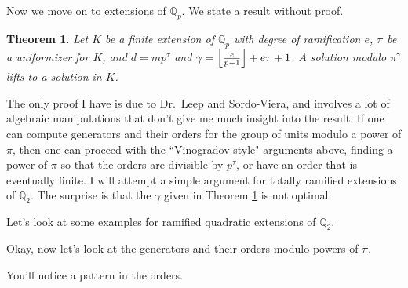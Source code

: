 \documentclass{article}
\newtheorem{theorem}{Theorem}
\DeclarePairedDelimiter\floor{\lfloor}{\rfloor}
\begin{document}
Now we move on to extensions of $\mathbb{Q}_p$.  We state a result without proof.

\begin{theorem}\label{leep}
Let $K$ be a finite extension of $\mathbb{Q}_p$ with degree of ramification $e$, $\pi$ be a uniformizer for $K$, and $d=m p^\tau$ and $\gamma = \floor*{\frac{e}{p-1}} + e\tau + 1$.  A solution modulo $\pi^\gamma$ lifts to a solution in $K$.
\end{theorem}

The only proof I have is due to Dr.\ Leep and Sordo-Viera, and involves a lot of algebraic manipulations that don't give me much insight into the result.  If one can compute generators and their orders for the group of units modulo a power of $\pi$, then one can proceed with the ``Vinogradov-style" arguments above, finding a power of $\pi$ so that the orders are divisible by $p^\tau$, or have an order that is eventually finite.  I will attempt a simple argument for totally ramified extensions of $\mathbb{Q}_2$.  The surprise is that the $\gamma$ given in Theorem \ref{leep} is not optimal.

Let's look at some examples for ramified quadratic extensions of $\mathbb{Q}_2$.

Okay, now let's look at the generators and their orders modulo powers of $\pi$.

You'll notice a pattern in the orders.



\end{document}
